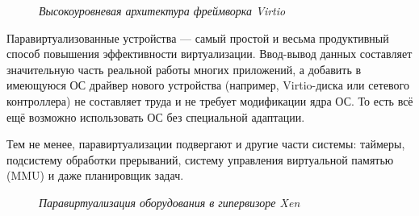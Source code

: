 \documentclass[14pt, a4paper]{article}
\begin{document}
\begin{figure}[h]%
    \centering
    \caption*{\textit{Высокоуровневая архитектура фреймворка Virtio}}
    \label{framework} %
\end{figure}

Паравиртуализованные устройства — самый простой и весьма продуктивный способ повышения
эффективности виртуализации. Ввод-вывод данных составляет значительную часть реальной работы
многих приложений, а добавить в имеющуюся ОС драйвер нового устройства (например, Virtio-диска
или сетевого контроллера) не составляет труда и не требует модификации ядра ОС. То есть всё ещё
возможно использовать ОС без специальной адаптации.

Тем не менее, паравиртуализации подвергают и другие части системы: таймеры, подсистему
обработки прерываний, систему управления виртуальной памятью (MMU) и даже планировщик задач.

\begin{figure}[h]%
    \centering
    \caption*{\textit{Паравиртуализация оборудования в гипервизоре Xen}}
    \label{framework} %
\end{figure}
\end{document}

